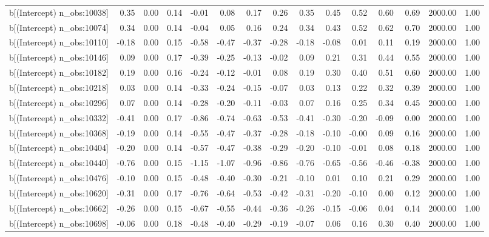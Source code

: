 \begin{table}[ht]
\begin{tabular}{rrrrrrrrrrrrrrr}
  b[(Intercept) n\_obs:10038] & 0.35 & 0.00 & 0.14 & -0.01 & 0.08 & 0.17 & 0.26 & 0.35 & 0.45 & 0.52 & 0.60 & 0.69 & 2000.00 & 1.00 \\ 
  b[(Intercept) n\_obs:10074] & 0.34 & 0.00 & 0.14 & -0.04 & 0.05 & 0.16 & 0.24 & 0.34 & 0.43 & 0.52 & 0.62 & 0.70 & 2000.00 & 1.00 \\ 
  b[(Intercept) n\_obs:10110] & -0.18 & 0.00 & 0.15 & -0.58 & -0.47 & -0.37 & -0.28 & -0.18 & -0.08 & 0.01 & 0.11 & 0.19 & 2000.00 & 1.00 \\ 
  b[(Intercept) n\_obs:10146] & 0.09 & 0.00 & 0.17 & -0.39 & -0.25 & -0.13 & -0.02 & 0.09 & 0.21 & 0.31 & 0.44 & 0.55 & 2000.00 & 1.00 \\ 
  b[(Intercept) n\_obs:10182] & 0.19 & 0.00 & 0.16 & -0.24 & -0.12 & -0.01 & 0.08 & 0.19 & 0.30 & 0.40 & 0.51 & 0.60 & 2000.00 & 1.00 \\ 
  b[(Intercept) n\_obs:10218] & 0.03 & 0.00 & 0.14 & -0.33 & -0.24 & -0.15 & -0.07 & 0.03 & 0.13 & 0.22 & 0.32 & 0.39 & 2000.00 & 1.00 \\ 
  b[(Intercept) n\_obs:10296] & 0.07 & 0.00 & 0.14 & -0.28 & -0.20 & -0.11 & -0.03 & 0.07 & 0.16 & 0.25 & 0.34 & 0.45 & 2000.00 & 1.00 \\ 
  b[(Intercept) n\_obs:10332] & -0.41 & 0.00 & 0.17 & -0.86 & -0.74 & -0.63 & -0.53 & -0.41 & -0.30 & -0.20 & -0.09 & 0.00 & 2000.00 & 1.00 \\ 
  b[(Intercept) n\_obs:10368] & -0.19 & 0.00 & 0.14 & -0.55 & -0.47 & -0.37 & -0.28 & -0.18 & -0.10 & -0.00 & 0.09 & 0.16 & 2000.00 & 1.00 \\ 
  b[(Intercept) n\_obs:10404] & -0.20 & 0.00 & 0.14 & -0.57 & -0.47 & -0.38 & -0.29 & -0.20 & -0.10 & -0.01 & 0.08 & 0.18 & 2000.00 & 1.00 \\ 
  b[(Intercept) n\_obs:10440] & -0.76 & 0.00 & 0.15 & -1.15 & -1.07 & -0.96 & -0.86 & -0.76 & -0.65 & -0.56 & -0.46 & -0.38 & 2000.00 & 1.00 \\ 
  b[(Intercept) n\_obs:10476] & -0.10 & 0.00 & 0.15 & -0.48 & -0.40 & -0.30 & -0.21 & -0.10 & 0.01 & 0.10 & 0.21 & 0.29 & 2000.00 & 1.00 \\ 
  b[(Intercept) n\_obs:10620] & -0.31 & 0.00 & 0.17 & -0.76 & -0.64 & -0.53 & -0.42 & -0.31 & -0.20 & -0.10 & 0.00 & 0.12 & 2000.00 & 1.00 \\ 
  b[(Intercept) n\_obs:10662] & -0.26 & 0.00 & 0.15 & -0.67 & -0.55 & -0.44 & -0.36 & -0.26 & -0.15 & -0.06 & 0.04 & 0.14 & 2000.00 & 1.00 \\ 
  b[(Intercept) n\_obs:10698] & -0.06 & 0.00 & 0.18 & -0.48 & -0.40 & -0.29 & -0.19 & -0.07 & 0.06 & 0.16 & 0.30 & 0.40 & 2000.00 & 1.00 \\ 

\end{tabular}
\end{table}
